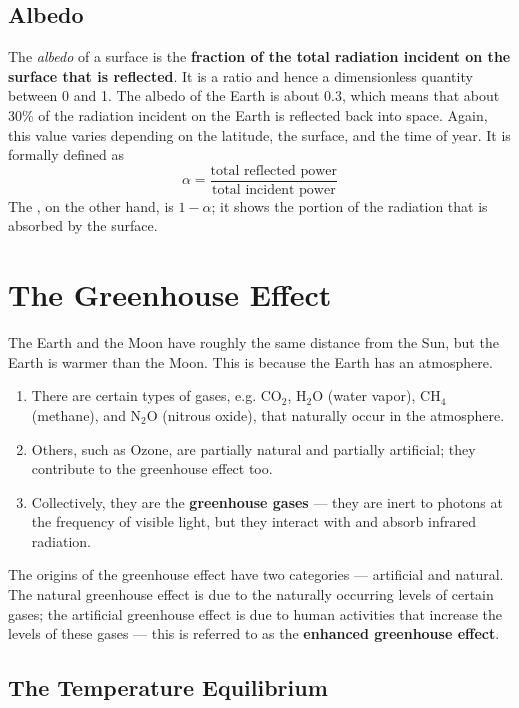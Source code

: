 \documentclass[a4paper,12pt]{article}
\let\oldsection\section
\renewcommand\section{\clearpage\oldsection}
\begin{document}
\pagebreak

\subsection{Albedo}

The \textit{albedo} of a surface is the \textbf{fraction of the total radiation incident on the surface that is reflected}. It is a ratio and hence a dimensionless quantity between 0 and 1. The albedo of the Earth is about 0.3, which means that about 30\% of the radiation incident on the Earth is reflected back into space. Again, this value varies depending on the latitude, the surface, and the time of year.
It is formally defined as
$$\alpha = \frac{\text{total reflected power}}{\text{total incident power}}$$
The , on the other hand, is $1 - \alpha$; it shows the portion of the radiation that is absorbed by the surface.


\section{The Greenhouse Effect}

The Earth and the Moon have roughly the same distance from the Sun, but the Earth is warmer than the Moon. This is because the Earth has an atmosphere.
\begin{enumerate}
  \item There are certain types of gases, e.g. CO$_2$, H$_2$O (water vapor), CH$_4$ (methane), and N$_2$O (nitrous oxide), that naturally occur in the atmosphere.
  \item Others, such as Ozone, are partially natural and partially artificial; they contribute to the greenhouse effect too.
  \item Collectively, they are the \textbf{greenhouse gases} --- they are inert to photons at the frequency of visible light, but they interact with and absorb infrared radiation.
\end{enumerate}
The origins of the greenhouse effect have two categories --- artificial and natural. The natural greenhouse effect is due to the naturally occurring levels of certain gases; the artificial greenhouse effect is due to human activities that increase the levels of these gases --- this is referred to as the \textbf{enhanced greenhouse effect}.

\subsection{The Temperature Equilibrium}
\end{document}
